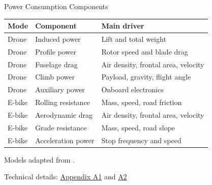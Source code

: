 \documentclass[9pt]{beamer}
\begin{document}
\begin{frame}{Power Consumption Components}
  \small
  \begin{center}
    \begin{tabular}{l l l}
      \toprule
      Mode & Component & Main driver \\
      \midrule
      Drone & Induced power & Lift and total weight \\
      Drone & Profile power & Rotor speed and blade drag \\
      Drone & Fuselage drag & Air density, frontal area, velocity \\
      Drone & Climb power & Payload, gravity, flight angle \\
      Drone & Auxiliary power & Onboard electronics \\
      \midrule
      E-bike & Rolling resistance & Mass, speed, road friction \\
      E-bike & Aerodynamic drag & Air density, frontal area, velocity \\
      E-bike & Grade resistance & Mass, speed, road slope \\
      E-bike & Acceleration power & Stop frequency and speed \\
      \bottomrule
    \end{tabular}
  \end{center}
\par\footnotesize Models adapted from \parencite{kirschstein_comparison_2020,stolaroff_energy_2018}.
\vspace{0.5em}
\par\scriptsize\color{gray} Technical details: \hyperlink{app:emission:1}{Appendix A1} and \hyperlink{app:emission:2}{A2}
\end{frame}
\end{document}
